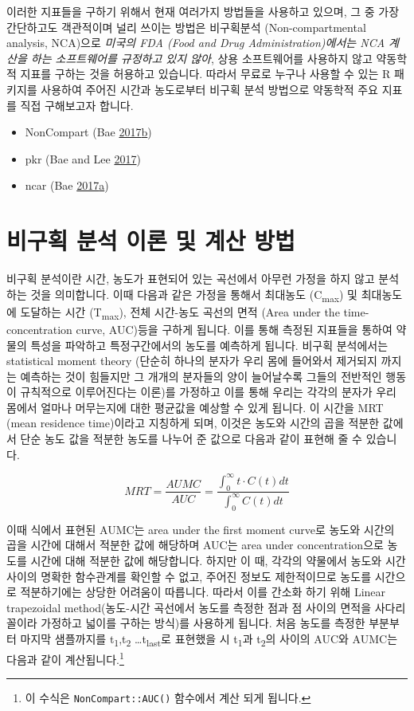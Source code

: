 \documentclass[12pt,]{krantz}
\providecommand{\tightlist}{%
  \setlength{\itemsep}{0pt}\setlength{\parskip}{0pt}}
\let\rmarkdownfootnote\footnote%
\def\footnote{\protect\rmarkdownfootnote}
\theoremstyle{definition}
\theoremstyle{definition}
\theoremstyle{definition}
\theoremstyle{remark}
\begin{document}
이러한 지표들을 구하기 위해서 현재 여러가지 방법들을 사용하고 있으며, 그
중 가장 간단하고도 객관적이며 널리 쓰이는 방법은 비구획분석
(Non-compartmental analysis, NCA)으로 \emph{미국의 FDA (Food and Drug
Administration)에서는 NCA 계산을 하는 소프트웨어를 규정하고 있지 않아},
상용 소프트웨어를 사용하지 않고 약동학적 지표를 구하는 것을 허용하고
있습니다. 따라서 무료로 누구나 사용할 수 있는 R 패키지를 사용하여 주어진
시간과 농도로부터 비구획 분석 방법으로 약동학적 주요 지표를 직접
구해보고자 합니다.

\begin{itemize}
\tightlist
\item
  NonCompart (Bae
  \protect\hyperlink{ref-R-NonCompart}{2017}\protect\hyperlink{ref-R-NonCompart}{b})
\item
  pkr (Bae and Lee \protect\hyperlink{ref-R-pkr}{2017})
\item
  ncar (Bae
  \protect\hyperlink{ref-R-ncar}{2017}\protect\hyperlink{ref-R-ncar}{a})
\end{itemize}

\section{비구획 분석 이론 및 계산 방법}\label{ncar-method}

비구획 분석이란 시간, 농도가 표현되어 있는 곡선에서 아무런 가정을 하지
않고 분석하는 것을 의미합니다. 이때 다음과 같은 가정을 통해서 최대농도
(C\textsubscript{max}) 및 최대농도에 도달하는 시간
(T\textsubscript{max}), 전체 시간-농도 곡선의 면적 (Area under the
time-concentration curve, AUC)등을 구하게 됩니다. 이를 통해 측정된
지표들을 통하여 약물의 특성을 파악하고 특정구간에서의 농도를 예측하게
됩니다. 비구획 분석에서는 statistical moment theory (단순히 하나의
분자가 우리 몸에 들어와서 제거되지 까지는 예측하는 것이 힘들지만 그
개개의 분자들의 양이 늘어날수록 그들의 전반적인 행동이 규칙적으로
이루어진다는 이론)를 가정하고 이를 통해 우리는 각각의 분자가 우리 몸에서
얼마나 머무는지에 대한 평균값을 예상할 수 있게 됩니다. 이 시간을 MRT
(mean residence time)이라고 지칭하게 되며, 이것은 농도와 시간의 곱을
적분한 값에서 단순 농도 값을 적분한 농도를 나누어 준 값으로 다음과 같이
표현해 줄 수 있습니다.

\[
MRT = \frac{AUMC}{AUC} = \frac{\int_{0}^{\infty} t \cdot C(t) dt}{\int_{0}^{\infty} C(t) dt}
\]

이때 식에서 표현된 AUMC는 area under the first moment curve로 농도와
시간의 곱을 시간에 대해서 적분한 값에 해당하며 AUC는 area under
concentration으로 농도를 시간에 대해 적분한 값에 해당합니다. 하지만 이
때, 각각의 약물에서 농도와 시간 사이의 명확한 함수관계를 확인할 수 없고,
주어진 정보도 제한적이므로 농도를 시간으로 적분하기에는 상당한 어려움이
따릅니다. 따라서 이를 간소화 하기 위해 Linear trapezoidal
method(농도-시간 곡선에서 농도를 측정한 점과 점 사이의 면적을
사다리꼴이라 가정하고 넓이를 구하는 방식)를 사용하게 됩니다. 처음 농도를
측정한 부분부터 마지막 샘플까지를 t\textsubscript{1},t\textsubscript{2}
\ldots{}t\textsubscript{last}로 표현했을 시 t\textsubscript{1}과
t\textsubscript{2}의 사이의 AUC와 AUMC는 다음과 같이
계산됩니다.\footnote{이 수식은 \texttt{NonCompart::AUC()} 함수에서 계산
  되게 됩니다.}
\end{document}
